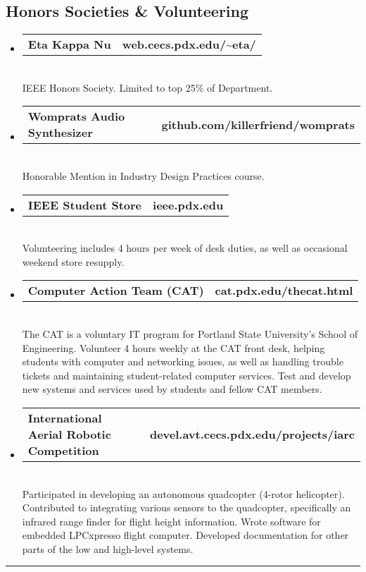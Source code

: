 \documentclass[10pt,letterpaper]{article}
\makeatletter
\newcommand{\headerrow}[2]
{\begin{tabular*}{\linewidth}{l@{\extracolsep{\fill}}r}
	#1 &
	#2 \\
\end{tabular*}}
\makeatother
\begin{document}
\subsection*{Honors Societies \& Volunteering}
\begin{itemize}
  \item
	\headerrow
		{\textbf{Eta Kappa Nu}}
		{\textbf{web.cecs.pdx.edu/\textasciitilde eta/}}
	\\
  IEEE Honors Society. Limited to top 25\% of Department.

  \item
	\headerrow
		{\textbf{Womprats Audio Synthesizer}}
		{\textbf{github.com/killerfriend/womprats}}
	\\
  Honorable Mention in Industry Design Practices course.
  
  \item
	\headerrow
		{\textbf{IEEE Student Store}}
		{\textbf{ieee.pdx.edu}}
	\\
  Volunteering includes 4 hours per week of desk duties, as well as occasional weekend store resupply.

  \item
  \headerrow
    {\textbf{Computer Action Team (CAT)}}
		{\textbf{cat.pdx.edu/thecat.html}}
	\\
  The CAT is a voluntary IT program for Portland State University's School of Engineering. Volunteer 4 hours weekly at the CAT front desk, helping students with computer and networking issues, as well as handling trouble tickets and maintaining student-related computer services. Test and develop new systems and services used by students and fellow CAT members. 

  \item
  \headerrow
    {\textbf{International Aerial Robotic Competition}}
		{\textbf{devel.avt.cecs.pdx.edu/projects/iarc}}
	\\
  Participated in developing an autonomous quadcopter (4-rotor helicopter). Contributed to integrating various sensors to the quadcopter, specifically an infrared range finder for flight height information. Wrote software for embedded LPCxpresso flight computer. Developed documentation for other parts of the low and high-level systems.
\end{itemize}
\vspace{1em}

\hrule
\vspace{-0.4em}
\end{document}
